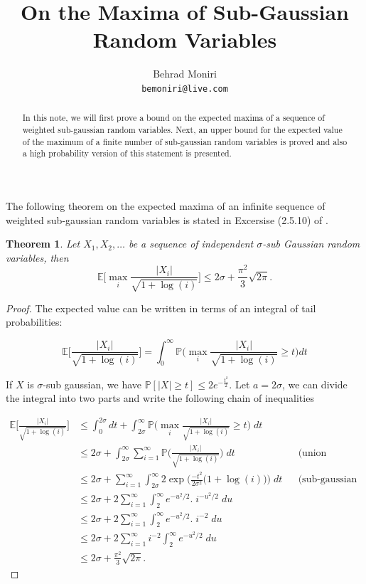 \documentclass[]{article}
\title{On the Maxima of Sub-Gaussian Random Variables}
\author{Behrad Moniri\\\texttt{bemoniri@live.com}}
\date{}
\newtheorem{theorem}{Theorem}
\newcommand{\E}{\mathbb{E}}
\newcommand{\Prob}{\mathbb{P}}
\begin{document}
	\maketitle
	
	
	\begin{abstract}
		In this note, we will first prove a	bound on the expected maxima of a sequence of weighted sub-gaussian random variables. Next, an upper bound for the expected value of the maximum of a finite number of sub-gaussian random variables is proved and also a high probability version of this statement is presented.
	\end{abstract}
	
	
	The following theorem on the expected maxima of an infinite sequence of weighted sub-gaussian random variables is stated in Excersise (2.5.10) of \cite{vershynin}.
	\begin{theorem}
		Let $X_1, X_2, \dots$ be a sequence of independent $\sigma$-sub Gaussian random variables, then
		\begin{equation}
		\label{bound}
			\E \Bigg[\max_i \frac{|X_i|}{\sqrt{1+\log(i)}}\Bigg] \leq 2\sigma + \frac{\pi^2}{3}\sqrt{2\pi}.
		\end{equation}
	\end{theorem}
	
	\begin{proof}
		The expected value can be written in terms of an integral of tail probabilities:
		
		\begin{equation*}
			\E\Bigg[\frac{|X_i|}{\sqrt{1+\log(i)}}\Bigg] = \int_{0}^{\infty} \mathbb{P}\Big(\max_i \frac{|X_i|}{\sqrt{1+\log(i)}} \geq t\Big) dt
		\end{equation*}
		
		If $X$ is $\sigma$-sub gaussian, we have $\Prob[|X|\geq t] \leq 2e^{-\frac{t^2}{2}}$.
		Let $a = 2\sigma$, we can divide the integral into two parts and write the following chain of inequalities
		
		\begin{align*}
		\E\Bigg[\frac{|X_i|}{\sqrt{1+\log(i)}}\Bigg] &\leq \int_{0}^{2\sigma}
		dt	
		+
		\int_{2\sigma}^{\infty}		
		 \mathbb{P}\Bigg(\max_i \frac{|X_i|}{\sqrt{1+\log(i)}} \geq t\Bigg)\; dt\\		 
		&\leq 2\sigma + \int_{2\sigma}^{\infty} \sum_{i = 1}^{\infty} \Prob\Bigg(\frac{|X_i|}{\sqrt{1+\log(i)}}\Bigg)\; dt && \text{(union bound)}\\
		&\leq 2\sigma + \sum_{i = 1}^{\infty} \int_{2\sigma}^{\infty} 
		2\exp\Big(\frac{-t^2}{2\sigma^2} \big(1+\log(i)\big)\Big)
		\; dt && \text{(sub-gaussian tails)}\\		
		&\leq 2\sigma + 2\sum_{i = 1}^{\infty} \int_{2}^{\infty} 
		e^{-u^2/2}.\;i^{-u^2/2}
		\; du \\
		&\leq 2\sigma + 2\sum_{i = 1}^{\infty} \int_{2}^{\infty} 
		e^{-u^2/2}.\;i^{-2}
		\; du \\
		&\leq 2\sigma + 2\sum_{i = 1}^{\infty}i^{-2} \int_{2}^{\infty} 
		e^{-u^2/2}
		\; du \\
		&\leq 2\sigma + \frac{\pi^2}{3}\sqrt{2\pi}.
		\end{align*}		
	\end{proof}
\end{document}
